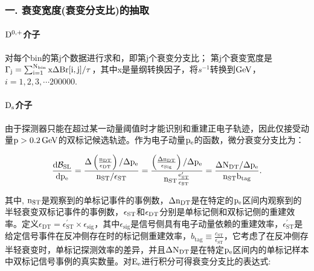 \subsubsection{一. 衰变宽度(衰变分支比)的抽取}
\paragraph{$\mathrm{D^{0,+}}$介子} 对每个bin的第j个数据进行求和，即第j个衰变分支比； 第j个衰变宽度是$\mathrm{\Gamma_{j}=\sum_{i=1}^{N_{bin}} x \Delta Br[i,j]/\tau}$，其中x是量纲转换因子，将$s^{-1}$转换到$\mathrm{GeV}$，$i=1,2,3,\cdots200000$.
\paragraph{$\mathrm{D_{s}}$介子} 
由于探测器只能在超过某一动量阈值时才能识别和重建正电子轨迹，因此仅接受动量$\mathrm{p}>0.2 \, \mathrm{GeV}$的双标记候选轨迹。作为电子动量$\mathrm{p_e}$的函数，微分衰变分支比为：

\begin{equation}
    \mathrm{\frac{d \mathcal{B}_{\mathrm{SL}}}{d p_{\mathrm{e}}}=\frac{\Delta\left(\frac{n_{\mathrm{DT}}}{\epsilon_{\mathrm{DT}}}\right) / \Delta p_{\mathrm{e}}}{n_{\mathrm{ST}} / \epsilon_{\mathrm{ST}}}=\frac{\left(\frac{\Delta n_{\mathrm{DT}}}{\epsilon_{\mathrm{Sig}}}\right) / \Delta p_{\mathrm{e}}}{n_{\mathrm{ST}} \frac{e_{\mathrm{ST}}^{\prime}}{\epsilon_{\mathrm{ST}}}}=\frac{\Delta N_{\mathrm{DT}} / \Delta p_e}{n_{\mathrm{ST}} b_{\mathrm{tag}}}}.
\end{equation}

其中, $\mathrm{n_{\mathrm{ST}}}$是观察到的单标记事件的事例数，$\mathrm{\Delta n_{\mathrm{DT}}}$是在特定的$\mathrm{p_e}$区间内观察到的半轻衰变双标记事件的事例数，$\mathrm{\epsilon_{\mathrm{ST}}}$和$\mathrm{\epsilon_{\mathrm{DT}}}$分别是单标记侧和双标记侧的重建效率。定义$\epsilon_{\mathrm{DT}}=\epsilon_{\mathrm{ST}}^{\prime} \times \epsilon_{\text{sig}}$，其中$\epsilon_{\text{sig}}$是信号侧具有电子动量依赖的重建效率，$\epsilon_{\mathrm{ST}}^{\prime}$是给定信号事件在反冲侧存在时的标记侧重建效率，$b_{\text{tag}} \equiv \frac{c_{\mathrm{ST}}}{\epsilon_{\mathrm{ST}}}$，它考虑了在反冲侧存半轻衰变时，单标记探测效率的差异，并且$\mathrm{\Delta N_{\mathrm{DT}}}$是在特定$\mathrm{p_e}$区间内的单标记样本中双标记信号事例的真实数量。对$\mathrm{E}_{\mathrm{e}}$进行积分可得衰变分支比的表达式:

